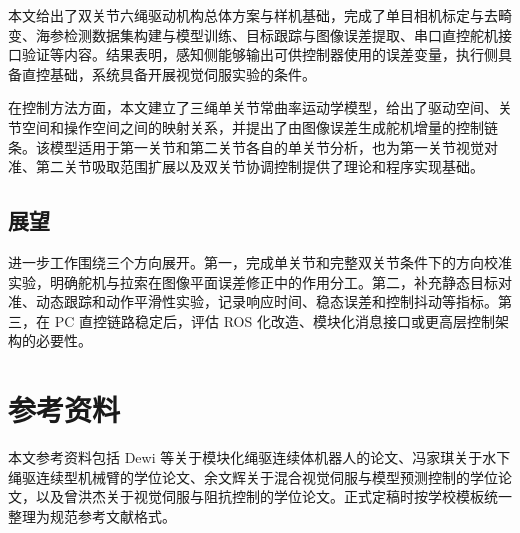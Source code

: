 \documentclass[UTF8,zihao=-4,oneside]{ctexrep}
\begin{document}
本文给出了双关节六绳驱动机构总体方案与样机基础，完成了单目相机标定与去畸变、海参检测数据集构建与模型训练、目标跟踪与图像误差提取、串口直控舵机接口验证等内容。结果表明，感知侧能够输出可供控制器使用的误差变量，执行侧具备直控基础，系统具备开展视觉伺服实验的条件。

在控制方法方面，本文建立了三绳单关节常曲率运动学模型，给出了驱动空间、关节空间和操作空间之间的映射关系，并提出了由图像误差生成舵机增量的控制链条。该模型适用于第一关节和第二关节各自的单关节分析，也为第一关节视觉对准、第二关节吸取范围扩展以及双关节协调控制提供了理论和程序实现基础。

\section{展望}

进一步工作围绕三个方向展开。第一，完成单关节和完整双关节条件下的方向校准实验，明确舵机与拉索在图像平面误差修正中的作用分工。第二，补充静态目标对准、动态跟踪和动作平滑性实验，记录响应时间、稳态误差和控制抖动等指标。第三，在 PC 直控链路稳定后，评估 ROS 化改造、模块化消息接口或更高层控制架构的必要性。

\chapter*{参考资料}

本文参考资料包括 Dewi 等关于模块化绳驱连续体机器人的论文、冯家琪关于水下绳驱连续型机械臂的学位论文、余文辉关于混合视觉伺服与模型预测控制的学位论文，以及曾洪杰关于视觉伺服与阻抗控制的学位论文。正式定稿时按学校模板统一整理为规范参考文献格式。
\end{document}
